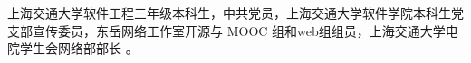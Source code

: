 

\begin{cvparagraph}
\begin{minipage}[t]{\textwidth}
上海交通大学软件工程三年级本科生，中共党员，上海交通大学软件学院本科生党支部宣传委员，东岳网络工作室开源与 MOOC 组和web组组员，上海交通大学电院学生会网络部部长
。
\end{minipage}
\end{cvparagraph}
